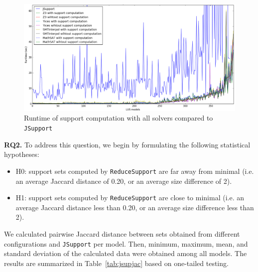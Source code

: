 \begin{figure}
  \centering
  \includegraphics[width=\columnwidth]{figs/runtimeAll.png}
  \caption{Runtime of support computation with all solvers compared to \texttt{JSupport}}\label{fig:runtimeall}
\end{figure}

 \vspace{6pt}
\noindent{}
 \vspace{6pt}

\textbf{RQ2.} To address this question,
we begin by formulating the following statistical hypotheses:
\begin{itemize}
  \item H0: support sets computed by \texttt{ReduceSupport} are far away from minimal (i.e. an average Jaccard distance of 0.20, or an average size difference of 2).
 \item H1: support sets computed by \texttt{ReduceSupport} are close to minimal (i.e. an average Jaccard distance less than 0.20, or an average size difference less than 2).
\end{itemize}
We calculated pairwise Jaccard distance between sets obtained from different configurations and \texttt{JSupport} per model. Then, minimum, maximum, mean, and standard deviation of the calculated data were obtained among all models. The results are summarized in Table~\ref{tab:jsupjac} based on one-tailed testing.

